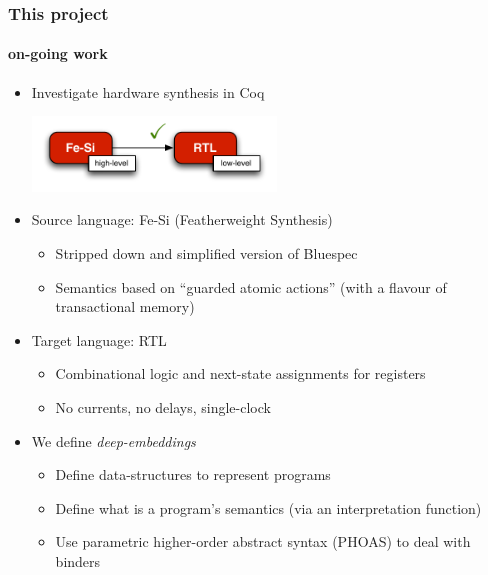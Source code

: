 \documentclass[9pt]{beamer}
\newcommand\fesi{Fe-Si}
\begin{document}
\begin{frame}
  \frametitle{This project}
  \framesubtitle{on-going work}
  \begin{itemize}
  \item  Investigate hardware synthesis in Coq
    
    \begin{center}
      \includegraphics[height= 2cm ]{figs/compilation.pdf}
    \end{center}
    \pause
    
  \item Source language: \alert{\fesi{}} (Featherweight Synthesis)
    \begin{itemize}
    \item Stripped down and simplified version of \alert{Bluespec} 
    \item Semantics based on ``guarded atomic actions'' (with a flavour of transactional memory)
    \end{itemize}
    
    \pause
    
  \item Target language: RTL
    \begin{itemize}
    \item Combinational logic and next-state assignments for registers
    \item No currents, no delays, single-clock
    \end{itemize}
    
    \pause
    
  \item We define \emph{deep-embeddings}
    \begin{itemize}
    \item Define data-structures to represent programs
    \item Define what is a program's semantics (via an interpretation function) 
    \item Use \alert{parametric higher-order abstract syntax} (PHOAS) to deal with binders
    \end{itemize}
  \end{itemize}
\end{frame}
\end{document}
